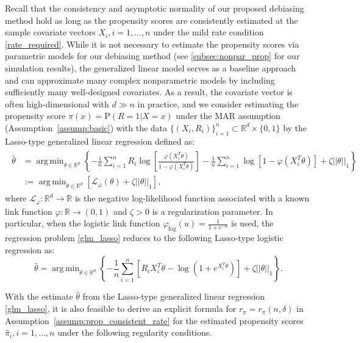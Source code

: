 \documentclass[ejsv2,noshowframe]{imsart}
\theoremstyle{plain}
\theoremstyle{definition}
\theoremstyle{remark}
\DeclareMathOperator*{\argmin}{arg\,min}
\newcommand{\norm}[1]{\left|\left| #1 \right|\right|}
\renewcommand{\hat}{\widehat}
\begin{document}
Recall that the consistency and asymptotic normality of our proposed debiasing method hold as long as the propensity scores are consistently estimated at the sample covariate vectors $X_i,i=1,...,n$ under the mild rate condition \eqref{rate_required}. While it is not necessary to estimate the propensity scores via parametric models for our debiasing method (see \autoref{subsec:nonpar_prop} for our simulation results), the generalized linear model serves as a baseline approach and can approximate many complex nonparametric models by including sufficiently many well-designed covariates. As a result, the covariate vector is often high-dimensional with $d\gg n$ in practice, and we consider estimating the propensity score $\pi(x)=\mathrm{P}(R=1|X=x)$ under the MAR assumption (Assumption~\ref{assump:basic}) with the data $\{(X_i,R_i)\}_{i=1}^n \subset \mathbb{R}^d \times \{0,1\}$ by the Lasso-type generalized linear regression defined as:
\begin{align}
	\label{glm_lasso}
	\begin{split}
		\hat{\theta}
		&=\argmin_{\theta \in \mathbb{R}^d} \left\{-\frac{1}{n} \sum_{i=1}^n R_i \log\left[\frac{\varphi(X_i^T\theta)}{1-\varphi(X_i^T\theta)} \right] -\frac{1}{n}\sum_{i=1}^n \log\left[1-\varphi(X_i^T \theta) \right]  + \zeta\norm{\theta}_1\right\}\\
		&:= \argmin_{\theta \in \mathbb{R}^d} \left[\mathcal{L}_{\varphi}(\theta) + \zeta\norm{\theta}_1 \right],
	\end{split}
\end{align}
where $\mathcal{L}_{\varphi}:\mathbb{R}^d \to \mathbb{R}$ is the negative log-likelihood function associated with a known link function $\varphi:\mathbb{R}\to (0,1)$ and $\zeta >0$ is a regularization parameter. In particular, when the logistic link function $\varphi_{\mathrm{log}}(u) = \frac{1}{1+e^{-u}}$ is used, the regression problem \eqref{glm_lasso} reduces to the following Lasso-type logistic regression as:
\begin{equation}
	\label{lr_lasso}
	\hat{\theta} = \argmin_{\theta \in \mathbb{R}^d} \left\{-\frac{1}{n}\sum_{i=1}^n \left[R_i X_i^T \theta - \log\left(1+e^{X_i^T \theta} \right) \right] + \zeta\norm{\theta}_1 \right\}.
\end{equation}

With the estimate $\hat{\theta}$ from the Lasso-type generalized linear regression \eqref{glm_lasso}, it is also feasible to derive an explicit formula for $r_{\pi}=r_{\pi}(n,\delta)$ in Assumption~\ref{assump:prop_consistent_rate} for the estimated propensity scores $\hat{\pi}_i,i=1,...,n$ under the following regularity conditions.
\end{document}
